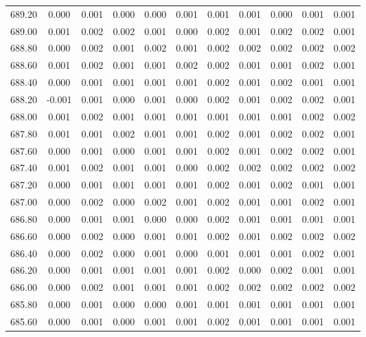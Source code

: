 \begin{longtable}{cccccccccc}
    689.20 &  0.000 &  0.001 &  0.000 &  0.000 &  0.001 &  0.001 &  0.001 &  0.000 &  0.001 &  0.001 \\
    689.00 &  0.001 &  0.002 &  0.002 &  0.001 &  0.000 &  0.002 &  0.001 &  0.002 &  0.002 &  0.001 \\
    688.80 &  0.000 &  0.002 &  0.001 &  0.002 &  0.001 &  0.002 &  0.002 &  0.002 &  0.002 &  0.002 \\
    688.60 &  0.001 &  0.002 &  0.001 &  0.001 &  0.002 &  0.002 &  0.001 &  0.001 &  0.002 &  0.001 \\
    688.40 &  0.000 &  0.001 &  0.001 &  0.001 &  0.001 &  0.002 &  0.001 &  0.002 &  0.001 &  0.001 \\
    688.20 & -0.001 &  0.001 &  0.000 &  0.001 &  0.000 &  0.002 &  0.001 &  0.002 &  0.002 &  0.001 \\
    688.00 &  0.001 &  0.002 &  0.001 &  0.001 &  0.001 &  0.001 &  0.001 &  0.001 &  0.002 &  0.002 \\
    687.80 &  0.001 &  0.001 &  0.002 &  0.001 &  0.001 &  0.002 &  0.001 &  0.002 &  0.002 &  0.001 \\
    687.60 &  0.000 &  0.001 &  0.000 &  0.001 &  0.001 &  0.002 &  0.001 &  0.002 &  0.002 &  0.001 \\
    687.40 &  0.001 &  0.002 &  0.001 &  0.001 &  0.000 &  0.002 &  0.002 &  0.002 &  0.002 &  0.002 \\
    687.20 &  0.000 &  0.001 &  0.001 &  0.001 &  0.001 &  0.002 &  0.001 &  0.002 &  0.001 &  0.001 \\
    687.00 &  0.000 &  0.002 &  0.000 &  0.002 &  0.001 &  0.002 &  0.001 &  0.001 &  0.002 &  0.001 \\
    686.80 &  0.000 &  0.001 &  0.001 &  0.000 &  0.000 &  0.002 &  0.001 &  0.001 &  0.001 &  0.001 \\
    686.60 &  0.000 &  0.002 &  0.000 &  0.001 &  0.001 &  0.002 &  0.001 &  0.002 &  0.002 &  0.002 \\
    686.40 &  0.000 &  0.002 &  0.000 &  0.001 &  0.000 &  0.001 &  0.001 &  0.001 &  0.002 &  0.001 \\
    686.20 &  0.000 &  0.001 &  0.001 &  0.001 &  0.001 &  0.002 &  0.000 &  0.002 &  0.001 &  0.001 \\
    686.00 &  0.000 &  0.002 &  0.001 &  0.001 &  0.001 &  0.002 &  0.002 &  0.002 &  0.002 &  0.002 \\
    685.80 &  0.000 &  0.001 &  0.000 &  0.000 &  0.001 &  0.001 &  0.001 &  0.001 &  0.001 &  0.001 \\
    685.60 &  0.000 &  0.001 &  0.000 &  0.001 &  0.001 &  0.002 &  0.001 &  0.001 &  0.001 &  0.001 \\

\end{longtable}
